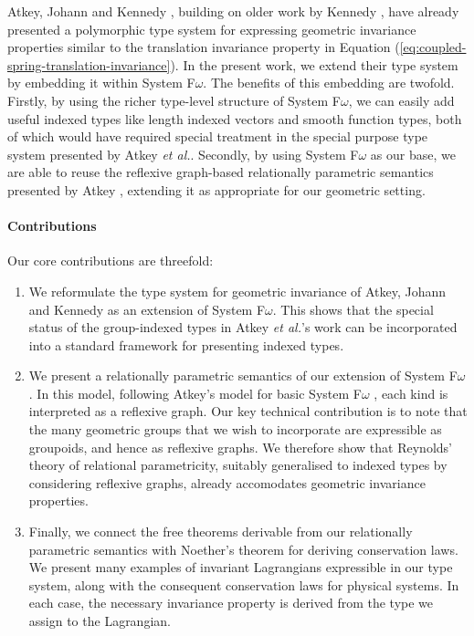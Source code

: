 \documentclass[preprint]{sigplanconf}
\theoremstyle{examplestyle}
\begin{document}
Atkey, Johann and Kennedy \cite{atkey13abstraction}, building on older
work by Kennedy \cite{kennedy94para}, have already presented a
polymorphic type system for expressing geometric invariance properties
similar to the translation invariance property in Equation
(\ref{eq:coupled-spring-translation-invariance}). In the present work,
we extend their type system by embedding it within System
F$\omega$. The benefits of this embedding are twofold. Firstly, by
using the richer type-level structure of System F$\omega$, we can
easily add useful indexed types like length indexed vectors and smooth
function types, both of which would have required special treatment in
the special purpose type system presented by Atkey \emph{et
  al.}. Secondly, by using System F$\omega$ as our base, we are able
to reuse the reflexive graph-based relationally parametric semantics
presented by Atkey \cite{atkey12relational}, extending it as
appropriate for our geometric setting.

\paragraph{Contributions}

Our core contributions are threefold:
\begin{enumerate}
\item We reformulate the type system for geometric invariance of
  Atkey, Johann and Kennedy \cite{atkey13abstraction} as an extension
  of System F$\omega$. This shows that the special status of the
  group-indexed types in Atkey \emph{et al.}'s work can be
  incorporated into a standard framework for presenting indexed types.
\item We present a relationally parametric semantics of our extension
  of System F$\omega$. In this model, following Atkey's model for
  basic System F$\omega$ \cite{atkey12relational}, each kind is
  interpreted as a reflexive graph. Our key technical contribution is
  to note that the many geometric groups that we wish to incorporate
  are expressible as groupoids, and hence as reflexive graphs. We
  therefore show that Reynolds' theory of relational parametricity,
  suitably generalised to indexed types by considering reflexive
  graphs, already accomodates geometric invariance properties.
\item Finally, we connect the free theorems derivable from our
  relationally parametric semantics with Noether's theorem for
  deriving conservation laws. We present many examples of invariant
  Lagrangians expressible in our type system, along with the
  consequent conservation laws for physical systems. In each case, the
  necessary invariance property is derived from the type we assign to
  the Lagrangian.
\end{enumerate}
\end{document}
